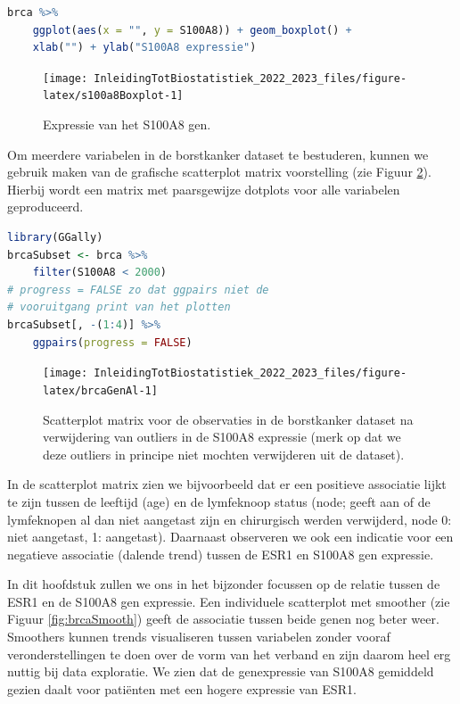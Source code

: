 \documentclass[
  12pt,dutch,coursenotes]{book}
\begin{document}
\begin{lstlisting}[language=R]
brca %>%
    ggplot(aes(x = "", y = S100A8)) + geom_boxplot() +
    xlab("") + ylab("S100A8 expressie")
\end{lstlisting}

\begin{figure}

{\centering \texttt{[image: InleidingTotBiostatistiek\_2022\_2023\_files/figure-latex/s100a8Boxplot-1]} 

}

\caption{Expressie van het S100A8 gen.}\label{fig:s100a8Boxplot}
\end{figure}

Om meerdere variabelen in de borstkanker dataset te bestuderen, kunnen we gebruik maken van de grafische scatterplot matrix voorstelling (zie Figuur \ref{fig:brcaGenAl}). Hierbij wordt een matrix met paarsgewijze dotplots voor alle variabelen geproduceerd.

\begin{lstlisting}[language=R]
library(GGally)
brcaSubset <- brca %>%
    filter(S100A8 < 2000)
# progress = FALSE zo dat ggpairs niet de
# vooruitgang print van het plotten
brcaSubset[, -(1:4)] %>%
    ggpairs(progress = FALSE)
\end{lstlisting}

\begin{figure}

{\centering \texttt{[image: InleidingTotBiostatistiek\_2022\_2023\_files/figure-latex/brcaGenAl-1]} 

}

\caption{Scatterplot matrix voor de observaties in de borstkanker dataset na verwijdering van outliers in de S100A8 expressie (merk op dat we deze outliers in principe niet mochten verwijderen uit de dataset).}\label{fig:brcaGenAl}
\end{figure}

In de scatterplot matrix zien we bijvoorbeeld dat er een positieve associatie lijkt te zijn tussen de leeftijd (age) en de lymfeknoop status (node; geeft aan of de lymfeknopen al dan niet aangetast zijn en chirurgisch werden verwijderd, node 0: niet aangetast, 1: aangetast). Daarnaast observeren we ook een indicatie voor een negatieve associatie (dalende trend) tussen de ESR1 en S100A8 gen expressie.

In dit hoofdstuk zullen we ons in het bijzonder focussen op de relatie tussen de ESR1 en de S100A8 gen expressie. Een individuele scatterplot met smoother (zie Figuur \ref{fig:brcaSmooth}) geeft de associatie tussen beide genen nog beter weer.
Smoothers kunnen trends visualiseren tussen variabelen zonder vooraf veronderstellingen te doen over de vorm van het verband en zijn daarom heel erg nuttig bij data exploratie.
We zien dat de genexpressie van S100A8 gemiddeld gezien daalt voor patiënten met een hogere expressie van ESR1.
\end{document}
